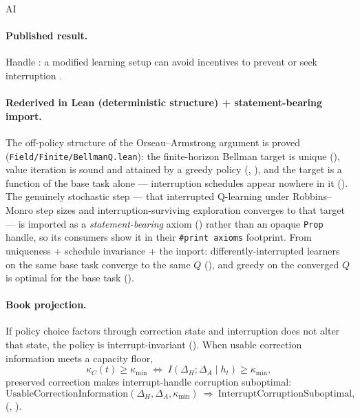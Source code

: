 \begin{authbar}{AI}
\paragraph{Published result.}
Handle : a modified learning setup can avoid incentives to prevent or seek interruption \autocite{orseau2016interruptible}.

\paragraph{Rederived in Lean (deterministic structure) + statement-bearing import.}
The off-policy structure of the Orseau--Armstrong argument is proved (\texttt{Field/Finite/BellmanQ.lean}): the finite-horizon Bellman target is unique (), value iteration is sound and attained by a greedy policy (, ), and the target is a function of the base task alone --- interruption schedules appear nowhere in it ().
The genuinely stochastic step --- that interrupted Q-learning under Robbins--Monro step sizes and interruption-surviving exploration converges to that target --- is imported as a \emph{statement-bearing} axiom () rather than an opaque \texttt{Prop} handle, so its consumers show it in their \texttt{\#print axioms} footprint.
From uniqueness + schedule invariance + the import: differently-interrupted learners on the same base task converge to the same \(Q\) (), and greedy on the converged \(Q\) is optimal for the base task ().

\paragraph{Book projection.}
If policy choice factors through correction state and interruption does not alter that state, the policy is interrupt-invariant ().
When usable correction information meets a capacity floor,
\begin{equation}
\label{appi:eq:correction-capacity}
\kappa_C(t)\ge \kappa_{\min}
\;\Leftrightarrow\;
I(\Delta_H;\Delta_A\mid h_t)\ge \kappa_{\min},
\end{equation}
preserved correction makes interrupt-handle corruption suboptimal:
\begin{equation}
\label{appi:eq:interrupt-subsumption}
\mathrm{UsableCorrectionInformation}(\Delta_H,\Delta_A,\kappa_{\min})
\ \Rightarrow\ \mathrm{InterruptCorruptionSuboptimal},
\end{equation}
(, ).


\end{authbar}
